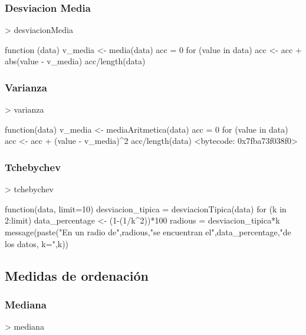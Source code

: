 \documentclass [a4paper] {article}
\begin{document}
\subsubsection{Desviacion Media}
\begin{Schunk}
\begin{Sinput}
> desviacionMedia
\end{Sinput}
\begin{Soutput}
function (data){
  v_media <- media(data)
  acc = 0
  for (value in data){
    acc <- acc + abs(value - v_media)
  }
  acc/length(data)
}
\end{Soutput}
\end{Schunk}
\subsubsection{Varianza}
\begin{Schunk}
\begin{Sinput}
> varianza
\end{Sinput}
\begin{Soutput}
function(data){
  v_media <- mediaAritmetica(data)
  acc = 0
  for (value in data){
    acc <- acc + (value - v_media)^2
  }
  acc/length(data)
}
<bytecode: 0x7fba73f038f0>
\end{Soutput}
\end{Schunk}
\subsubsection{Tchebychev}
\begin{Schunk}
\begin{Sinput}
> tchebychev
\end{Sinput}
\begin{Soutput}
function(data, limit=10){
  desviacion_tipica = desviacionTipica(data)
  for (k in 2:limit){
    data_percentage <- (1-(1/k^2))*100
    radious = desviacion_tipica*k
    message(paste("En un radio de",radious,"se encuentran el",data_percentage,"de los datos, k=",k))
  }
}
\end{Soutput}
\end{Schunk}
\subsection{Medidas de ordenación}
\subsubsection{Mediana}
\begin{Schunk}
\begin{Sinput}
> mediana
\end{Sinput}
\end{Schunk}
\end{document}
